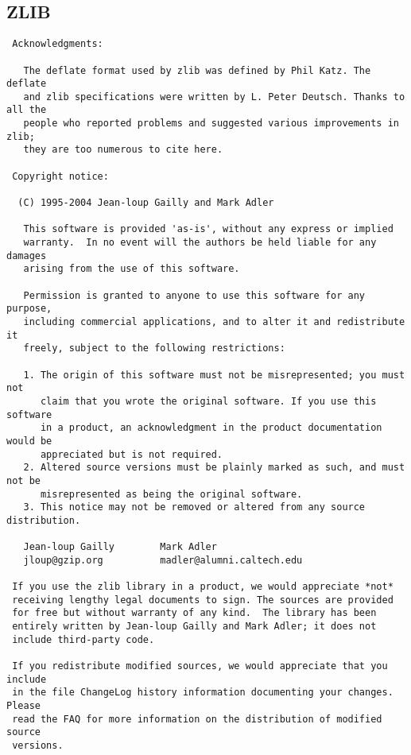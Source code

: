 \subsection{ZLIB}
\begin{verbatim}
 Acknowledgments:

   The deflate format used by zlib was defined by Phil Katz. The deflate
   and zlib specifications were written by L. Peter Deutsch. Thanks to all the
   people who reported problems and suggested various improvements in zlib;
   they are too numerous to cite here.

 Copyright notice:

  (C) 1995-2004 Jean-loup Gailly and Mark Adler

   This software is provided 'as-is', without any express or implied
   warranty.  In no event will the authors be held liable for any damages
   arising from the use of this software.

   Permission is granted to anyone to use this software for any purpose,
   including commercial applications, and to alter it and redistribute it
   freely, subject to the following restrictions:

   1. The origin of this software must not be misrepresented; you must not
      claim that you wrote the original software. If you use this software
      in a product, an acknowledgment in the product documentation would be
      appreciated but is not required.
   2. Altered source versions must be plainly marked as such, and must not be
      misrepresented as being the original software.
   3. This notice may not be removed or altered from any source distribution.

   Jean-loup Gailly        Mark Adler
   jloup@gzip.org          madler@alumni.caltech.edu

 If you use the zlib library in a product, we would appreciate *not*
 receiving lengthy legal documents to sign. The sources are provided
 for free but without warranty of any kind.  The library has been
 entirely written by Jean-loup Gailly and Mark Adler; it does not
 include third-party code.

 If you redistribute modified sources, we would appreciate that you include
 in the file ChangeLog history information documenting your changes. Please
 read the FAQ for more information on the distribution of modified source
 versions.
\end{verbatim}

